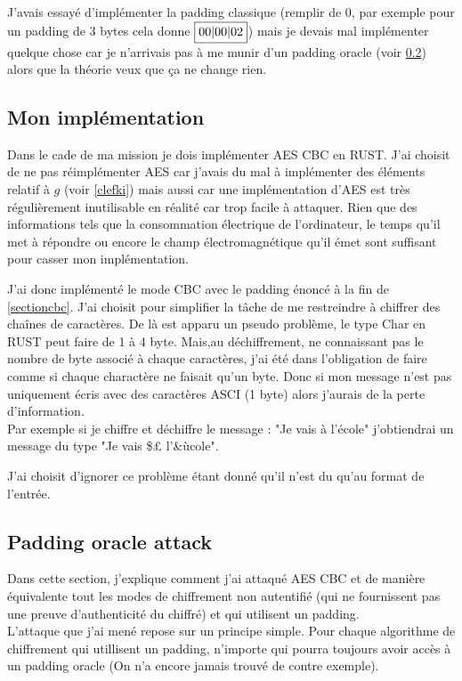 \documentclass[a4paper, 12pt]{article}
\begin{document}
J'avais essayé d'implémenter la padding classique (remplir de $0$, par exemple pour un padding de 3 bytes cela donne $\fbox{00|00|02}$) mais je devais mal implémenter quelque chose car je n'arrivais pas à me munir d'un padding oracle (voir \ref{padoracle}) alors que la théorie veux que ça ne change rien.

\subsection{Mon implémentation}
Dans le cade de ma mission je dois implémenter AES CBC en RUST. 
J'ai choisit de ne pas réimplémenter AES car j'avais du mal à implémenter des éléments relatif à $g$ (voir \ref{clefki}) mais aussi car une implémentation d'AES est très régulièrement inutilisable en réalité car trop facile à attaquer. Rien que des informations tels que la consommation électrique de l'ordinateur, le temps qu'il met à répondre ou encore le champ électromagnétique qu'il émet sont suffisant pour casser mon implémentation. 

J'ai donc implémenté le mode CBC avec le padding énoncé à la fin de \ref{sectioncbc}. J'ai choisit pour simplifier la tâche de me restreindre à chiffrer des chaînes de caractères. De là est apparu un pseudo problème, le type Char en RUST peut faire de 1 à 4 byte. Mais,au déchiffrement, ne connaissant pas le nombre de byte associé à chaque caractères, j'ai été dans l'obligation de faire comme si chaque charactère ne faisait qu'un byte. Donc si mon message n'est pas uniquement écris avec des caractères ASCI (1 byte) alors j'aurais de la perte d'information. \\
Par exemple si je chiffre et déchiffre le message : "Je vais à l'école" j'obtiendrai un message du type "Je vais \$£ l'\&ùcole".

J'ai choisit d'ignorer ce problème étant donné qu'il n'est du qu'au format de l'entrée.

\subsection{Padding oracle attack}\label{padoracle}
Dans cette section, j'explique comment j'ai attaqué AES CBC et de manière équivalente tout les modes de chiffrement non autentifié (qui ne fournissent pas une preuve d'authenticité du chiffré) et qui utilisent un padding. \\ 

L'attaque que j'ai mené repose sur un principe simple. Pour chaque algorithme de chiffrement qui utillisent un padding, n'importe qui pourra toujours avoir accès à un padding oracle (On n'a encore jamais trouvé de contre exemple). 
\end{document}
